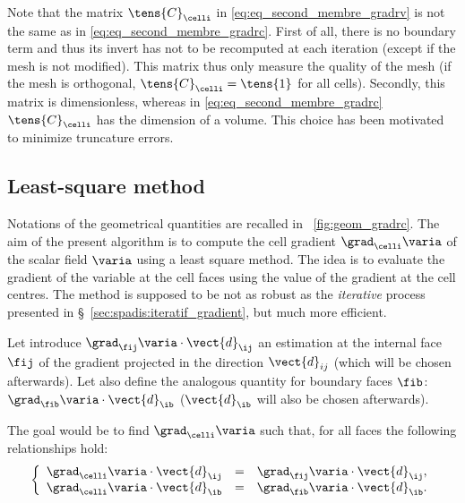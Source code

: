 \begin{remark}
Note that the matrix $\tens{C}_{\celli}$ in \eqref{eq:eq_second_membre_gradrv} is not the same as in \eqref{eq:eq_second_membre_gradrc}. First of all,
there is no boundary term and thus its invert has not to be recomputed at each iteration (except if the mesh is not modified). This matrix thus  only
measure the quality of the mesh (if the mesh is orthogonal, $\tens{C}_{\celli} = \tens{1}$ for all cells).
Secondly, this matrix is dimensionless, whereas in \eqref{eq:eq_second_membre_gradrc} $\tens{C}_\celli$ has the dimension of a volume. This choice has 
been motivated to minimize truncature errors.
\end{remark}

\subsection{Least-square method}\label{sec:spadis:least_square_gradient}
%
Notations of the geometrical quantities are recalled in \figurename~\ref{fig:geom_gradrc}.
The aim of the present algorithm is to compute the cell gradient $\grad_{\celli} \varia $ of the scalar field $\varia$
using a least square method. 
The idea is to evaluate the gradient of the variable at the cell faces using the value of the gradient at the cell centres.
The method is supposed to be not as robust as the \emph{iterative} process presented in \S~\ref{sec:spadis:iteratif_gradient}, 
but much more efficient.

Let introduce $\grad_\fij \varia \cdot \vect{d}_\ij$  an estimation at the internal face $\fij$
of the gradient projected in the direction $\vect{d}_{ij}$ (which will be chosen afterwards).
Let also define the analogous quantity for boundary faces $\fib$: $\grad_\fib \varia \cdot \vect{d}_\ib$
 ($\vect{d}_\ib$ will also be chosen afterwards).

The goal would be to find $\grad_{\celli} \varia $ such that, for all faces
the following relationships hold:
\begin{equation}
\left\{\begin{array}{r c l}
\grad_{\celli} \varia  \cdot \vect{d}_\ij &=& \grad_\fij \varia \cdot \vect{d}_\ij , \\
\grad_{\celli} \varia  \cdot \vect{d}_\ib &=& \grad_\fib \varia \cdot \vect{d}_\ib .
\end{array}\right.
\end{equation}

